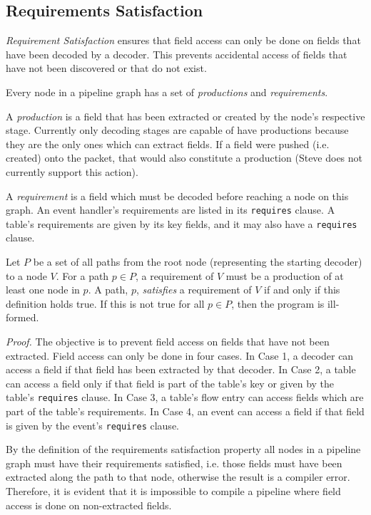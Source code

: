 \subsection{Requirements Satisfaction} \label{guide:requirements}

\textit{Requirement Satisfaction} ensures that field access can only be done on fields that have been decoded by a decoder. This prevents accidental access of fields that have not been discovered or that do not exist.

Every node in a pipeline graph has a set of \textit{productions} and \textit{requirements}.

A \textit{production} is a field that has been extracted or created by the node's respective stage. Currently only decoding stages are capable of have productions because they are the only ones which can extract fields. If a field were pushed (i.e. created) onto the packet, that would also constitute a production (Steve does not currently support this action).

A \emph{requirement} is a field which must be decoded before reaching a node on
this graph. An event handler's requirements are listed in its
\texttt{\color{green}requires} clause. A table's requirements are given by its
key fields, and it may also have a \texttt{\color{green}requires} clause.

Let $P$ be a set of all paths from the root node (representing the starting decoder) to a node $V$.
For a path $p \in P$, a requirement of $V$ must be a production of at least one node in
$p$. A path, $p$, \emph{satisfies} a requirement of $V$ if and only if this
definition holds true. If this is not true for all $p \in P$, then the program
is ill-formed.

\textit{Proof.} 
The objective is to prevent field access on fields that have not been extracted. Field access can only be done in four cases. In Case 1, a decoder can access a field if that field has been extracted by that decoder. In Case 2, a table can access a field only if that field is part of the table's key or given by the table's \texttt{requires} clause. In Case 3, a table's flow entry can access fields which are part of the table's requirements. In Case 4, an event can access a field if that field is given by the event's \texttt{requires} clause.

By the definition of the requirements satisfaction property all nodes in a pipeline graph must have their requirements satisfied, i.e. those fields must have been extracted along the path to that node, otherwise the result is a compiler error. Therefore, it is evident that it is impossible to compile a pipeline where field access is done on non-extracted fields.

